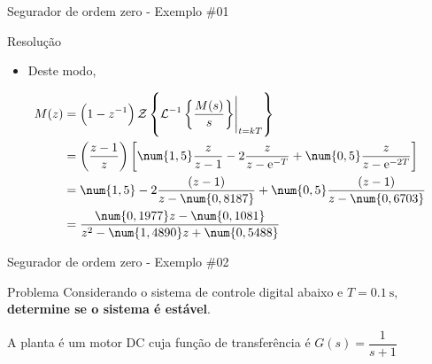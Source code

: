 \begin{frame}{Segurador de ordem zero - Exemplo \#01}
\begin{block}{Resolução}
\begin{itemize}
    \item Deste modo,
\end{itemize}
\begin{align*}
    M(z)&=\left( 1-z^{-1}\right) \mathcal{Z}\left\lbrace \eval{\mathcal{L}^{-1}\left\lbrace \dfrac{M(s)}{s} \right\rbrace}_{t=kT}\right\rbrace \\
    &=\left(\dfrac{z-1}{z}\right) \left[ \num{1,5}\dfrac{z}{z-1} -2\dfrac{z}{z-\text{e}^{-T}}+\num{0,5}\dfrac{z}{z-\text{e}^{-2T}} \right] \\
    &=\num{1,5}-2\dfrac{(z-1)}{z-\num{0,8187}}+\num{0,5}\dfrac{(z-1)}{z-\num{0,6703}} \\
    &=\dfrac{\num{0,1977}z - \num{0,1081}}{z^2-\num{1,4890}z + \num{0,5488}}
\end{align*}
\end{block}
\end{frame}

\cprotect{}

\begin{frame}{Segurador de ordem zero - Exemplo \#02}
\begin{block}{Problema}
Considerando o sistema de controle digital abaixo e $ T=\SI{0.1}{\second} $, \textbf{determine se o sistema é estável}.

\vspace{0.5cm}

A planta é um motor DC cuja função de transferência é $G(s)=\dfrac{1}{s+1}$
\end{block}

\vspace{0.5cm}

\centering

\scalebox{0.8}{}
\end{frame}

